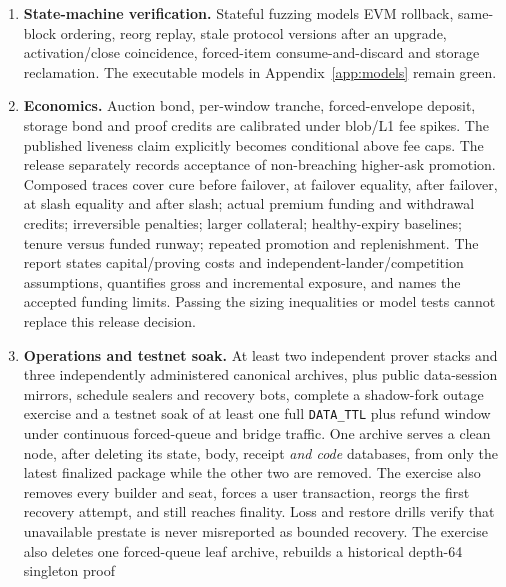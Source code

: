 \documentclass[a4paper,11pt]{article}
\newcommand{\code}[1]{\nolinkurl{#1}}
\begin{document}
\begin{enumerate}
that each of the three canonical commit paths writes exactly one
\code{(uint48(l2BlockNumber), tipHash, stateRoot)}, that a
reverting \code{saveCheckpoint} rolls back the commit, that the write is
accepted while the SignalService is paused, that the activation import's
optional repeat write is idempotent, and that the existing L1
\code{Bridge.processMessage} proves an L2 signal against a Settlement-written
checkpoint with the unchanged \code{HopProof} path.
\item \textbf{State-machine verification.} Stateful fuzzing models EVM rollback,
same-block ordering, reorg replay, stale protocol versions after an upgrade,
activation/close coincidence, forced-item consume-and-discard and storage
reclamation.  The executable models in Appendix~\ref{app:models} remain green.
\item \textbf{Economics.} Auction bond, per-window tranche, forced-envelope
deposit, storage bond and proof credits are calibrated under blob/L1 fee spikes.
The published liveness claim explicitly becomes conditional above fee caps.
The release separately records acceptance of non-breaching higher-ask
promotion.  Composed traces cover cure before failover, at failover equality,
after failover, at slash equality and after slash; actual premium funding and
withdrawal credits; irreversible penalties; larger collateral; healthy-expiry
baselines; tenure versus funded runway; repeated promotion and replenishment.
The report states capital/proving costs and independent-lander/competition
assumptions, quantifies gross and incremental exposure, and names the accepted
funding limits.  Passing the sizing inequalities or model tests cannot replace
this release decision.
\item \textbf{Operations and testnet soak.} At least two independent prover
stacks and three independently administered canonical archives, plus public
data-session mirrors, schedule sealers and recovery bots, complete a
shadow-fork outage exercise and a testnet soak of at least one full
\code{DATA_TTL} plus refund window under continuous forced-queue and bridge
traffic.  One archive serves a clean node, after deleting its state, body,
receipt \emph{and code} databases, from only the latest finalized package while
the other two are removed.  The exercise also removes every
builder and seat, forces a user transaction, reorgs the first recovery attempt,
and still reaches finality.  Loss and restore drills verify that unavailable
prestate is never misreported as bounded recovery.  The exercise also deletes
one forced-queue leaf archive, rebuilds a historical depth-64 singleton proof

\end{enumerate}
\end{document}
